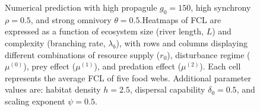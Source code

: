 \begin{figure}
\centering
{}
\caption{\label{fig:fig-num8}Numerical prediction with high propagule
\(g_0 = 150\), high synchrony \(\rho = 0.5\), and strong omnivory
\(\theta = 0.5\).Heatmaps of FCL are expressed as a function of
ecosystem size (river length, \(L\)) and complexity (branching rate,
\(\lambda_b\)), with rows and columns displaying different combinations
of resource supply (\(r_0\)), disturbance regime (\(\mu^{(0)}\)), prey
effect (\(\mu^{(1)}\)), and predation effect (\(\mu^{(2)}\)). Each cell
represents the average FCL of five food webs. Additional parameter
values are: habitat density \(h=2.5\), dispersal capability
\(\delta_0=0.5\), and scaling exponent \(\psi=0.5\).}
\end{figure}

\newpage
